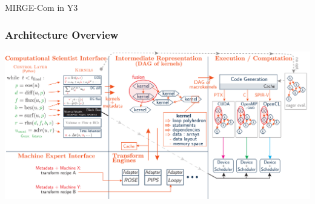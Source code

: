 \begin{frame}
    \centering
    \Large
    MIRGE-Com in Y3
\end{frame}

\begin{frame}\frametitle{Architecture Overview}
  \begin{center}
  \includegraphics[width=.95\textwidth]{Figures/controllayer-new.pdf}
  \end{center}
\end{frame}


